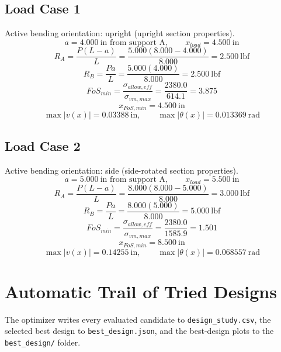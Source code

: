 \documentclass[11pt]{article}
\begin{document}
\subsection*{Load Case 1}
Active bending orientation: upright (upright section properties).
\[a = 4.000\ \mathrm{in} \text{ from support A}, \qquad x_{load} = 4.500\ \mathrm{in}\]
\[R_A = \frac{P(L-a)}{L} = \frac{5.000(8.000-4.000)}{8.000} = 2.500\ \mathrm{lbf}\]
\[R_B = \frac{Pa}{L} = \frac{5.000(4.000)}{8.000} = 2.500\ \mathrm{lbf}\]
\[FoS_{min} = \frac{\sigma_{allow,eff}}{\sigma_{vm,max}} = \frac{2380.0}{614.1} = 3.875\]
\[x_{FoS,min} = 4.500\ \mathrm{in}\]
\[\max |v(x)| = 0.03388\ \mathrm{in}, \qquad \max |\theta(x)| = 0.013369\ \mathrm{rad}\]
\subsection*{Load Case 2}
Active bending orientation: side (side-rotated section properties).
\[a = 5.000\ \mathrm{in} \text{ from support A}, \qquad x_{load} = 5.500\ \mathrm{in}\]
\[R_A = \frac{P(L-a)}{L} = \frac{8.000(8.000-5.000)}{8.000} = 3.000\ \mathrm{lbf}\]
\[R_B = \frac{Pa}{L} = \frac{8.000(5.000)}{8.000} = 5.000\ \mathrm{lbf}\]
\[FoS_{min} = \frac{\sigma_{allow,eff}}{\sigma_{vm,max}} = \frac{2380.0}{1585.9} = 1.501\]
\[x_{FoS,min} = 8.500\ \mathrm{in}\]
\[\max |v(x)| = 0.14255\ \mathrm{in}, \qquad \max |\theta(x)| = 0.068557\ \mathrm{rad}\]

\section*{Automatic Trail of Tried Designs}
The optimizer writes every evaluated candidate to \texttt{design\_study.csv}, the selected best design to \texttt{best\_design.json}, and the best-design plots to the \texttt{best\_design/} folder.
\end{document}

